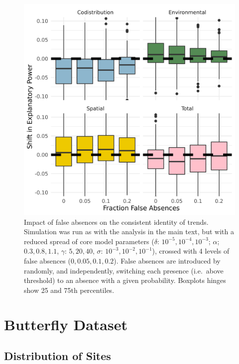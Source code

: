 \documentclass[
]{article}
\begin{document}
\begin{figure}
\centering
\includegraphics{SimulationMarkdowns/Figures/FalseAbs.png}
\caption{Impact of false absences on the consistent identity of trends.
Simulation was run as with the analysis in the main text, but with a
reduced spread of core model parameters (\(\delta\):
\(10^{-5}, 10^{-4}, 10^{-3}\); \(\alpha\); \(0.3, 0.8, 1.1\),
\(\gamma\): \(5, 20, 40\), \(\sigma\): \(10^{-3}, 10^{-2}, 10^{-1}\)),
crossed with 4 levels of false absences (\(0, 0.05, 0.1, 0.2\)). False
absences are introduced by randomly, and independently, switching each
presence (i.e.~above threshold) to an absence with a given probability.
Boxplots hinges show 25 and 75th percentiles.}
\end{figure}

\hypertarget{butterfly-dataset}{%
\section{Butterfly Dataset}\label{butterfly-dataset}}

\hypertarget{distribution-of-sites}{%
\subsection{Distribution of Sites}\label{distribution-of-sites}}
\end{document}
